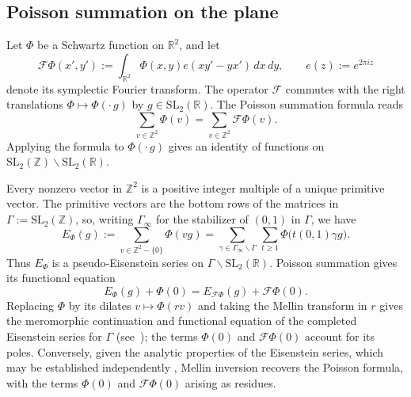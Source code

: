 \documentclass[reqno]{amsart}
\theoremstyle{plain}
\theoremstyle{definition}
\theoremstyle{itplain}
\numberwithin{equation}{section}
\numberwithin{theorem}{section}
\begin{document}
\subsection{Poisson summation on the plane}\label{sec:poisson-summation-plane}
Let $\Phi$ be a Schwartz function on $\mathbb{R}^2$, and let
\begin{equation*}
  \mathcal{F} \Phi(x', y') := \int_{\mathbb{R}^2} \Phi(x, y) e(x y' - y x') \, d x \, d y,
  \qquad
  e(z) := e^{2 \pi i z}
\end{equation*}
denote its symplectic Fourier transform.  The operator $\mathcal{F}$ commutes with the right translations $\Phi \mapsto \Phi(\cdot \, g)$ by $g \in \mathrm{SL}_2(\mathbb{R})$.  The Poisson summation formula reads
\begin{equation}\label{eq:intro-poisson-Z}
  \sum_{v \in \mathbb{Z}^2} \Phi(v) = \sum_{v \in \mathbb{Z}^2} \mathcal{F} \Phi(v).
\end{equation}
Applying the formula to $\Phi(\cdot \, g)$ gives an identity of functions on \(\mathrm{SL}_2(\mathbb Z)\backslash\mathrm{SL}_2(\mathbb R)\).

Every nonzero vector in $\mathbb{Z}^2$ is a positive integer multiple of a unique primitive vector.  The primitive vectors are the bottom rows of the matrices in $\Gamma := \mathrm{SL}_2(\mathbb{Z})$, so, writing $\Gamma_\infty$ for the stabilizer of $(0, 1)$ in $\Gamma$, we have
\begin{equation*}
  E_\Phi(g)
  := \sum_{v \in \mathbb{Z}^2 - \{0\}} \Phi(v g)
  = \sum_{\gamma \in \Gamma_\infty \backslash \Gamma} \,
  \sum_{t \geq 1} \Phi \bigl( t (0, 1) \gamma g \bigr).
\end{equation*}
Thus $E_\Phi$ is a pseudo-Eisenstein series on $\Gamma \backslash \mathrm{SL}_2(\mathbb{R})$.  Poisson summation gives its functional equation
\begin{equation}\label{eq:intro-pseudo-eisenstein}
  E_\Phi(g) + \Phi(0) = E_{\mathcal{F} \Phi}(g) + \mathcal{F} \Phi(0).
\end{equation}
Replacing $\Phi$ by its dilates $v \mapsto \Phi(r v)$ and taking the Mellin transform in $r$ gives the meromorphic continuation and functional equation of the completed Eisenstein series for $\Gamma$ (see~\cite[\S\S3--5]{MR0210827}); the terms $\Phi(0)$ and $\mathcal{F} \Phi(0)$ account for its poles.  Conversely, given the analytic properties of the Eisenstein series, which may be established independently \cite{Se56}, Mellin inversion recovers the Poisson formula, with the terms $\Phi(0)$ and $\mathcal{F} \Phi(0)$ arising as residues.
\end{document}
